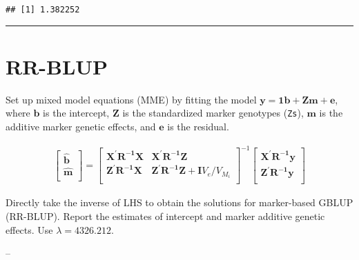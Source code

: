 \documentclass[
]{article}
\newenvironment{Shaded}{\begin{snugshade}}{\end{snugshade}}
\newcommand{\CommentTok}[1]{\textcolor[rgb]{0.56,0.35,0.01}{\textit{#1}}}
\begin{document}
\begin{verbatim}
## [1] 1.382252
\end{verbatim}

\begin{Shaded}
\end{Shaded}

\begin{center}\rule{0.5\linewidth}{0.5pt}\end{center}

\section{RR-BLUP}\label{rr-blup}

Set up mixed model equations (MME) by fitting the model
\(\mathbf{y = 1b + Zm + e}\), where \(\mathbf{b}\) is the intercept,
\(\mathbf{Z}\) is the standardized marker genotypes (\texttt{Zs}),
\(\mathbf{m}\) is the additive marker genetic effects, and
\(\mathbf{e}\) is the residual.

\begin{align*}
  \begin{bmatrix}
    \mathbf{\hat{b}} \\
    \mathbf{\hat{m}} \\
  \end{bmatrix}
  =
  \begin{bmatrix}
    \mathbf{X^{'}R^{-1}X} & \mathbf{X^{'}R^{-1}Z} \\
    \mathbf{Z^{'}R^{-1}X} & \mathbf{Z^{'}R^{-1}Z} + \mathbf{I} V_e/V_{M_i} \\
  \end{bmatrix}^{-1}
  \begin{bmatrix}
    \mathbf{X^{'}R^{-1}y} \\
    \mathbf{Z^{'}R^{-1}y} \\
  \end{bmatrix}
\end{align*}

Directly take the inverse of LHS to obtain the solutions for
marker-based GBLUP (RR-BLUP). Report the estimates of intercept and
marker additive genetic effects. Use \(\lambda = 4326.212\).

--
\end{document}
